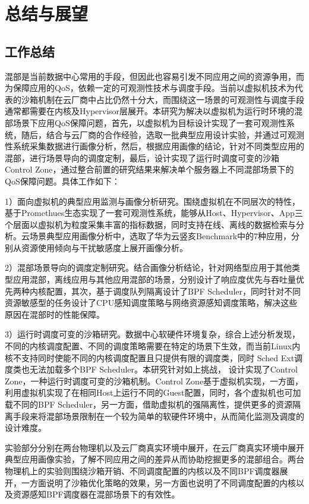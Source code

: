 \chapter{总结与展望}\label{chap:theories_tech}

\section{工作总结}

混部是当前数据中心常用的手段，但因此也容易引发不同应用之间的资源争用，而为保障应用的QoS，依赖一定的可观测性技术与调度手段。当前以虚拟机技术为代表的沙箱机制在云厂商中占比仍然十分大，而围绕这一场景的可观测性与调度手段通常都需要在内核及Hypervisor层展开。本研究为解决以虚拟机为运行时环境的混部场景下应用QoS保障问题，首先，以虚拟机为目标设计实现了一套可观测性系统，随后，结合与云厂商的合作经验，选取一批典型应用设计实验，并通过可观测性系统采集数据进行画像分析，然后，根据应用画像的结论，针对不同类型应用的混部，进行场景导向的调度定制，最后，设计实现了运行时调度可变的沙箱Control Zone，通过整合前置的研究结果来解决单个服务器上不同混部场景下的QoS保障问题。具体工作如下：

1）面向虚拟机的典型应用监测与画像分析研究。围绕虚拟机在不同层次的特性，基于Promethues生态实现了一套可观测性系统，能够从Host、Hypervisor、App三个层面以虚拟机为粒度采集丰富的指标数据，同时支持在线、离线的数据检索与分析。云场景典型应用画像分析中，选取了华为云竖亥Benchmark中的7种应用，分别从资源使用倾向与干扰敏感度上展开画像分析。

2）混部场景导向的调度定制研究。结合画像分析结论，针对网络型应用于其他类型应用混部，离线应用与其他应用混部的场景，分别设计了响应度优先与吞吐量优先两种内核配置，其次，基于调度队列隔离设计了BPF Scheduler，同时针对不同资源敏感型的任务设计了CPU感知调度策略与网络资源感知调度策略，解决这些原因在混部时的性能保障。

3）运行时调度可变的沙箱研究。数据中心软硬件环境复杂，综合上述分析发现，不同的内核调度配置、不同的调度策略需要在特定的场景下生效，而当前Linux内核不支持同时使能不同的内核调度配置且只提供有限的调度类，同时 Sched Ext调度类也无法加载多个BPF Scheduler。本研究针对如上挑战， 设计实现了Control Zone，一种运行时调度可变的沙箱机制。Control Zone基于虚拟机实现，一方面，利用虚拟机实现了在相同Host上运行不同的Guest配置，同时，各个虚拟机也可加载不同的BPF Scheduler，另一方面，借助虚拟机的强隔离性，提供更多的资源隔离手段来将混部场景限制在一个较为简单的软硬件环境中，从而简化监测及调度的设计难度。

实验部分分别在两台物理机以及云厂商真实环境中展开，在云厂商真实环境中展开典型应用画像实验，了解不同应用之间的差异从而协助挖掘更多的混部组合。两台物理机上的实验则围绕沙箱开销、不同调度配置的内核以及不同BPF调度器展开，一方面说明了沙箱优化策略的效果，另一方面也说明了不同调度配置的内核以及资源感知BPF调度器在混部场景下的有效性。

